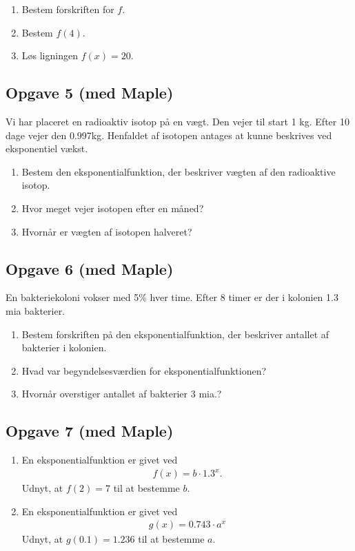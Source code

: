 \begin{enumerate}[label=\roman*)]
	\item Bestem forskriften for $f$.
	\item Bestem $f(4)$.
	\item Løs ligningen $f(x)=20$.
\end{enumerate}


\subsection*{Opgave 5 (med Maple)}
Vi har placeret en radioaktiv isotop på en vægt. Den vejer til start 1 kg. Efter 10 dage vejer den 0.997kg. Henfaldet af isotopen antages at kunne beskrives ved eksponentiel vækst.
\begin{enumerate}[label=\roman*)]
	\item  Bestem den eksponentialfunktion, der beskriver vægten af den radioaktive isotop.
	\item Hvor meget vejer isotopen efter en måned?
	\item Hvornår er vægten af isotopen halveret?
\end{enumerate}

\subsection*{Opgave 6 (med Maple)}
En bakteriekoloni vokser med 5$\%$ hver time. Efter 8 timer er der i kolonien 1.3 mia bakterier. 
\begin{enumerate}[label=\roman*)]
	\item Bestem forskriften på den eksponentialfunktion, der beskriver antallet af bakterier i kolonien. 
	\item Hvad var begyndelsesværdien for eksponentialfunktionen?
	\item Hvornår overstiger antallet af bakterier 3 mia.?
\end{enumerate}

\subsection*{Opgave 7 (med Maple)}
\begin{enumerate}[label=\roman*)]
	\item En eksponentialfunktion er givet ved
	\begin{align*}
		f(x) = b \cdot 1.3^x.
	\end{align*}
	Udnyt, at $f(2) = 7$ til at bestemme $b$.
	\item En eksponentialfunktion er givet ved
	\begin{align*}
		g(x) = 0.743\cdot a^x
	\end{align*}
	Udnyt, at $g(0.1) = 1.236$ til at bestemme $a$.  
\end{enumerate}


